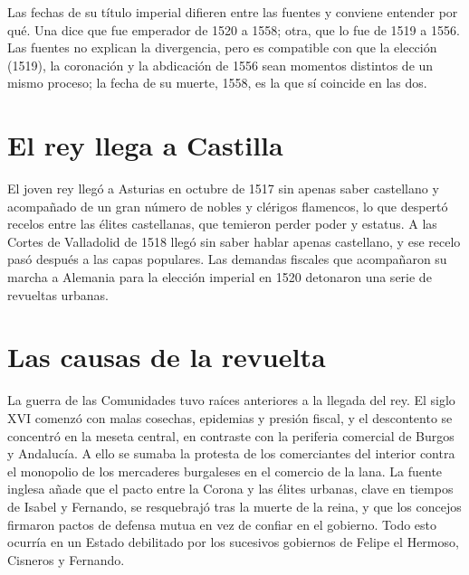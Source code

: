 \documentclass{book}
\begin{document}

Las fechas de su título imperial difieren entre las fuentes y conviene entender por qué. Una dice que fue emperador de 1520 a 1558; otra, que lo fue de 1519 a 1556. Las fuentes no explican la divergencia, pero es compatible con que la elección (1519), la coronación y la abdicación de 1556 sean momentos distintos de un mismo proceso; la fecha de su muerte, 1558, es la que sí coincide en las dos.


\section{El rey llega a Castilla}

El joven rey llegó a Asturias en octubre de 1517 sin apenas saber castellano y acompañado de un gran número de nobles y clérigos flamencos, lo que despertó recelos entre las élites castellanas, que temieron perder poder y estatus. A las Cortes de Valladolid de 1518 llegó sin saber hablar apenas castellano, y ese recelo pasó después a las capas populares. Las demandas fiscales que acompañaron su marcha a Alemania para la elección imperial en 1520 detonaron una serie de revueltas urbanas.


\section{Las causas de la revuelta}

La guerra de las Comunidades tuvo raíces anteriores a la llegada del rey. El siglo XVI comenzó con malas cosechas, epidemias y presión fiscal, y el descontento se concentró en la meseta central, en contraste con la periferia comercial de Burgos y Andalucía. A ello se sumaba la protesta de los comerciantes del interior contra el monopolio de los mercaderes burgaleses en el comercio de la lana. La fuente inglesa añade que el pacto entre la Corona y las élites urbanas, clave en tiempos de Isabel y Fernando, se resquebrajó tras la muerte de la reina, y que los concejos firmaron pactos de defensa mutua en vez de confiar en el gobierno. Todo esto ocurría en un Estado debilitado por los sucesivos gobiernos de Felipe el Hermoso, Cisneros y Fernando.
\end{document}
